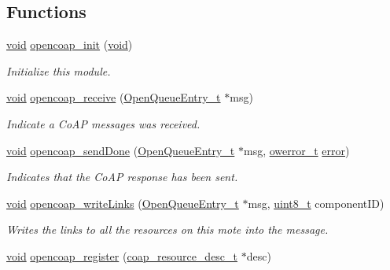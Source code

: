\subsection*{Functions}
\begin{DoxyCompactItemize}
\item 
\hyperlink{usb__devapi_8h_afabf60e7f57651d6d595a02c75f07cd0}{void} \hyperlink{group__open_coap_ga53a859522b159c54e76dc8a20cbdd3ff}{opencoap\+\_\+init} (\hyperlink{usb__devapi_8h_afabf60e7f57651d6d595a02c75f07cd0}{void})
\begin{DoxyCompactList}\small\item\em Initialize this module. \end{DoxyCompactList}\item 
\hyperlink{usb__devapi_8h_afabf60e7f57651d6d595a02c75f07cd0}{void} \hyperlink{group__open_coap_gaaa4778341676139ae72ad5dd515a816d}{opencoap\+\_\+receive} (\hyperlink{struct_open_queue_entry__t}{Open\+Queue\+Entry\+\_\+t} $\ast$msg)
\begin{DoxyCompactList}\small\item\em Indicate a Co\+AP messages was received. \end{DoxyCompactList}\item 
\hyperlink{usb__devapi_8h_afabf60e7f57651d6d595a02c75f07cd0}{void} \hyperlink{group__open_coap_gad576f6262590140be3771817a151fc45}{opencoap\+\_\+send\+Done} (\hyperlink{struct_open_queue_entry__t}{Open\+Queue\+Entry\+\_\+t} $\ast$msg, \hyperlink{opendefs_8h_af20b7c3ed9d2ba19e56a309ad9314803}{owerror\+\_\+t} \hyperlink{disk_8c_ad018a3100b2dabad325a0800152db297}{error})
\begin{DoxyCompactList}\small\item\em Indicates that the Co\+AP response has been sent. \end{DoxyCompactList}\item 
\hyperlink{usb__devapi_8h_afabf60e7f57651d6d595a02c75f07cd0}{void} \hyperlink{group__open_coap_ga3cbc2d2d4a78ae1474cd5105ebc7b3a8}{opencoap\+\_\+write\+Links} (\hyperlink{struct_open_queue_entry__t}{Open\+Queue\+Entry\+\_\+t} $\ast$msg, \hyperlink{_p_e___types_8h_aba7bc1797add20fe3efdf37ced1182c5}{uint8\+\_\+t} component\+ID)
\begin{DoxyCompactList}\small\item\em Writes the links to all the resources on this mote into the message. \end{DoxyCompactList}\item 
\hyperlink{usb__devapi_8h_afabf60e7f57651d6d595a02c75f07cd0}{void} \hyperlink{group__open_coap_ga82e1d3e8b96366e52348c479f7582c0d}{opencoap\+\_\+register} (\hyperlink{structcoap__resource__desc__t}{coap\+\_\+resource\+\_\+desc\+\_\+t} $\ast$desc)

\end{DoxyCompactItemize}
